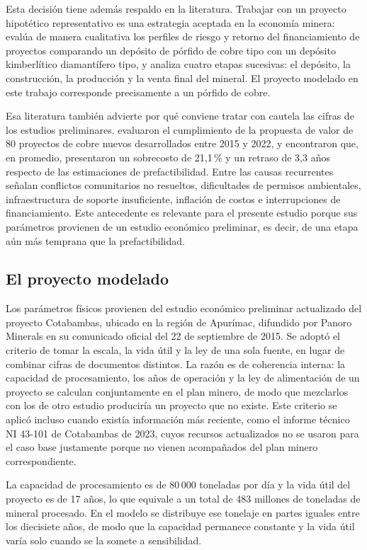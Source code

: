 Esta decisión tiene además respaldo en la literatura. Trabajar con un proyecto
hipotético representativo es una estrategia aceptada en la economía minera:
\textcite{cunningham2025} evalúa de manera cualitativa los perfiles de riesgo y
retorno del financiamiento de proyectos comparando un depósito de pórfido de cobre
tipo con un depósito kimberlítico diamantífero tipo, y analiza cuatro etapas
sucesivas: el depósito, la construcción, la producción y la venta final del mineral.
El proyecto modelado en este trabajo corresponde precisamente a un pórfido de cobre.

Esa literatura también advierte por qué conviene tratar con cautela las cifras de los
estudios preliminares. \textcite{lagos2026} evaluaron el cumplimiento de la propuesta
de valor de 80 proyectos de cobre nuevos desarrollados entre 2015 y 2022, y
encontraron que, en promedio, presentaron un sobrecosto de 21,1\,\% y un retraso de
3,3 años respecto de las estimaciones de prefactibilidad. Entre las causas recurrentes
señalan conflictos comunitarios no resueltos, dificultades de permisos ambientales,
infraestructura de soporte insuficiente, inflación de costos e interrupciones de
financiamiento. Este antecedente es relevante para el presente estudio porque sus
parámetros provienen de un estudio económico preliminar, es decir, de una etapa aún
más temprana que la prefactibilidad.

\subsection{El proyecto modelado}

Los parámetros físicos provienen del estudio económico preliminar actualizado del
proyecto Cotabambas, ubicado en la región de Apurímac, difundido por Panoro
Minerals en su comunicado oficial del 22 de septiembre de 2015. Se adoptó el
criterio de tomar la escala, la vida útil y la ley de una sola fuente, en lugar de
combinar cifras de documentos distintos. La razón es de coherencia interna: la
capacidad de procesamiento, los años de operación y la ley de alimentación de un
proyecto se calculan conjuntamente en el plan minero, de modo que mezclarlos con
los de otro estudio produciría un proyecto que no existe. Este criterio se aplicó
incluso cuando existía información más reciente, como el informe técnico NI 43-101
de Cotabambas de 2023, cuyos recursos actualizados no se usaron para el caso base
justamente porque no vienen acompañados del plan minero correspondiente.

La capacidad de procesamiento es de 80\,000 toneladas por día y la vida útil del
proyecto es de 17 años, lo que equivale a un total de 483 millones de toneladas de
mineral procesado. En el modelo se distribuye ese tonelaje en partes iguales entre
los diecisiete años, de modo que la capacidad permanece constante y la vida útil
varía solo cuando se la somete a sensibilidad.

